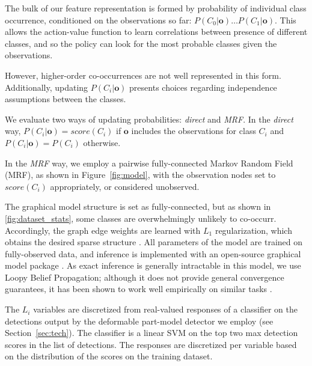 The bulk of our feature representation is formed by probability of individual class occurrence, conditioned on the observations so far: $P(C_0|\mathbf{o}) \ldots P(C_1|\mathbf{o})$.
This allows the action-value function to learn correlations between presence of different classes, and so the policy can look for the most probable classes given the observations.

However, higher-order co-occurrences are not well represented in this form.
Additionally, updating $P(C_i|\mathbf{o})$ presents choices regarding independence assumptions between the classes.

We evaluate two ways of updating probabilities: \emph{direct} and \emph{MRF}.
In the \emph{direct} way, $P(C_i|\mathbf{o}) = score(C_i)$ if $\mathbf{o}$ includes the observations for class $C_i$ and $P(C_i|\mathbf{o}) = P(C_i)$ otherwise.

In the \emph{MRF} way, we employ a pairwise fully-connected Markov Random Field (MRF), as shown in Figure~\ref{fig:model}, with the observation nodes set to $score(C_i)$ appropriately, or considered unobserved.

The graphical model structure is set as fully-connected, but as shown in \autoref{fig:dataset_stats}, some classes are overwhelmingly unlikely to co-occurr.
Accordingly, the graph edge weights are learned with $L_1$ regularization, which obtains the desired sparse structure \cite{Lee2006}.
All parameters of the model are trained on fully-observed data, and inference is implemented with an open-source graphical model package \cite{Jaimovich2010}.
As exact inference is generally intractable in this model, we use Loopy Belief Propagation; although it does not provide general convergence guarantees, it has been shown to work well empirically on similar tasks \cite{Desai2009}.

The $L_i$ variables are discretized from real-valued responses of a classifier on the detections output by the deformable part-model detector we employ (see Section~\ref{sec:tech}).
The classifier is a linear SVM on the top two max detection scores in the list of detections.
The responses are discretized per variable based on the distribution of the scores on the training dataset.
